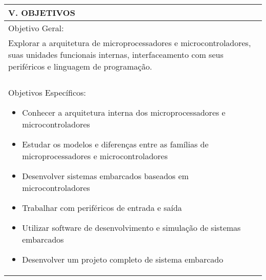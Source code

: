 \documentclass[12pt]{article}
\begin{document}
\begin{longtable}{|L{1.025\textwidth}|} \hline
%
{\bf V. OBJETIVOS } \\ \hline
%
Objetivo Geral: \\

Explorar a arquitetura de microprocessadores e microcontroladores, suas unidades funcionais internas, interfaceamento com  seus periféricos e linguagem de programação.\\
\\
Objetivos Específicos: 
\begin{itemize}
\item Conhecer a arquitetura interna dos microprocessadores e microcontroladores
\item Estudar os modelos e diferenças entre as famílias de microprocessadores e microcontroladores
\item Desenvolver sistemas embarcados baseados em microcontroladores
\item Trabalhar com periféricos de entrada e saída
\item Utilizar software de desenvolvimento e simulação de sistemas embarcados
\item Desenvolver um projeto completo de sistema embarcado
\end{itemize}
\\ \hline
\end{longtable}
\end{document}

